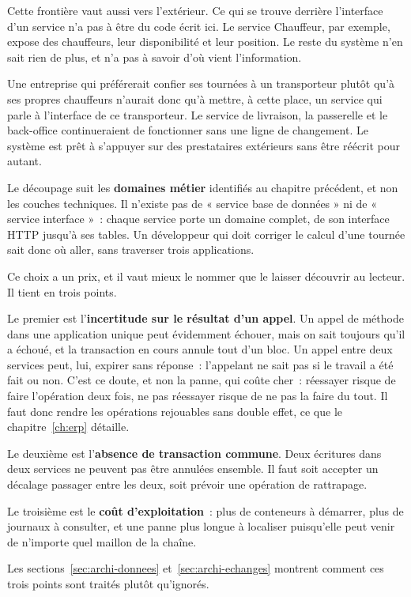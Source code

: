 Cette frontière vaut aussi vers l'extérieur. Ce qui se trouve derrière l'interface d'un service n'a
pas à être du code écrit ici. Le service Chauffeur, par exemple, expose des chauffeurs, leur
disponibilité et leur position. Le reste du système n'en sait rien de plus, et n'a pas à savoir d'où
vient l'information.

Une entreprise qui préférerait confier ses tournées à un transporteur plutôt qu'à ses propres
chauffeurs n'aurait donc qu'à mettre, à cette place, un service qui parle à l'interface de ce
transporteur. Le service de livraison, la passerelle et le back-office continueraient de fonctionner
sans une ligne de changement. Le système est prêt à s'appuyer sur des prestataires extérieurs sans
être réécrit pour autant.

Le découpage suit les \textbf{domaines métier} identifiés au chapitre précédent, et non les couches
techniques. Il n'existe pas de « service base de données » ni de « service interface »~: chaque
service porte un domaine complet, de son interface HTTP jusqu'à ses tables. Un développeur qui doit
corriger le calcul d'une tournée sait donc où aller, sans traverser trois applications.

Ce choix a un prix, et il vaut mieux le nommer que le laisser découvrir au lecteur. Il tient en
trois points.

Le premier est l'\textbf{incertitude sur le résultat d'un appel}. Un appel de méthode dans une
application unique peut évidemment échouer, mais on sait toujours qu'il a échoué, et la transaction
en cours annule tout d'un bloc. Un appel entre deux services peut, lui, expirer sans réponse~:
l'appelant ne sait pas si le travail a été fait ou non. C'est ce doute, et non la panne, qui coûte
cher~: réessayer risque de faire l'opération deux fois, ne pas réessayer risque de ne pas la faire du
tout. Il faut donc rendre les opérations rejouables sans double effet, ce que le chapitre~\ref{ch:erp}
détaille.

Le deuxième est l'\textbf{absence de transaction commune}. Deux écritures dans deux services ne
peuvent pas être annulées ensemble. Il faut soit accepter un décalage passager entre les deux, soit
prévoir une opération de rattrapage.

Le troisième est le \textbf{coût d'exploitation}~: plus de conteneurs à démarrer, plus de journaux à
consulter, et une panne plus longue à localiser puisqu'elle peut venir de n'importe quel maillon de
la chaîne.

Les sections~\ref{sec:archi-donnees} et~\ref{sec:archi-echanges} montrent comment ces trois points
sont traités plutôt qu'ignorés.

